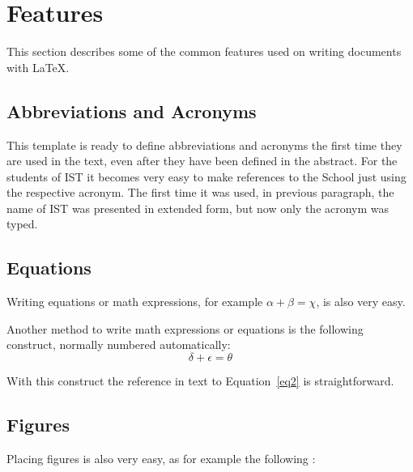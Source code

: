 \documentclass[a4paper,12pt,journal,twoside,compsoc]{PPIEEEtran}
\begin{document}
\section{Features}
\label{features}
This section describes some of the common features used on writing documents with \LaTeX.
\subsection{Abbreviations and Acronyms} 
This template is ready to define abbreviations and acronyms the first time they are used in the text, even after they have been defined in the abstract.
For the students of \ac{IST} it becomes very easy to make references to the School just using the respective acronym. The first time it was used, in previous paragraph, the name of \ac{IST} was presented in extended form, but now only the acronym was typed.
\subsection{Equations}
Writing equations or math expressions, for example $\alpha + \beta = \chi$, is also very easy.

Another method to write math expressions or equations is the following construct, normally numbered automatically:
\begin{equation}
\delta + \epsilon = \theta
\label{eq2}
\end{equation}

With this construct the reference in text to Equation~\ref{eq2} is straightforward.
\subsection{Figures}
Placing figures is also very easy, as for example the following :
\end{document}
